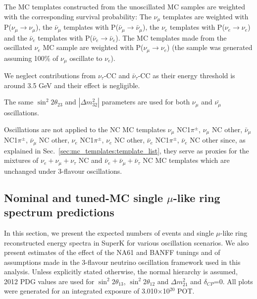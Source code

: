 The MC templates constructed from the unoscillated MC samples are weighted 
with the corresponding survival probability:
The $\nu_{\mu}$ templates are weighted with P($\nu_{\mu}\rightarrow\nu_{\mu}$),
the $\bar{\nu}_{\mu}$ templates with P($\bar{\nu}_{\mu}\rightarrow\bar{\nu}_{\mu}$),
the $\nu_{e}$ templates with P($\nu_{e}\rightarrow\nu_{e}$) and
the $\bar{\nu}_{e}$ templates with P($\bar{\nu}_{e}\rightarrow\bar{\nu}_{e}$).
The MC templates made from the oscillated $\nu_{e}$ MC sample are weighted with 
P($\nu_{\mu}\rightarrow\nu_{e}$) (the sample was generated assuming 100\% of 
$\nu_{\mu}$ oscillate to $\nu_{e}$).

We neglect contributions from $\nu_{\tau}$-CC and $\bar{\nu}_{\tau}$-CC as their
energy threshold is around 3.5 GeV and their effect is negligible.

The same $\sin^{2}{2\theta_{23}}$ and $|\Delta m^{2}_{32}|$ parameters 
are used for both $\nu_{\mu}$ and $\bar{\nu_{\mu}}$ oscillations.

Oscillations are not applied to the NC MC templates
  $\nu_{\mu}$ NC1$\pi^{\pm}$, 
  $\nu_{\mu}$ NC other, 
  $\bar{\nu}_{\mu}$ NC1$\pi^{\pm}$, 
  $\bar{\nu}_{\mu}$ NC other, 
  $\nu_{e}$ NC1$\pi^{\pm}$,
  $\nu_{e}$ NC other,
  $\bar{\nu}_{e}$ NC1$\pi^{\pm}$,
  $\bar{\nu}_{e}$ NC other
since, as explained in Sec.\ \ref{sec:mc_templates:template_list}, they serve as proxies for the mixtures of 
$\nu_{e}+\nu_{\mu}+\nu_{\tau}$ NC and 
$\bar{\nu}_{e}+\bar{\nu}_{\mu}+\bar{\nu}_{\tau}$ NC MC templates
which are unchanged under 3-flavour oscillations.



\subsection {Nominal and tuned-MC single $\mu$-like ring spectrum predictions}
\label{sec:nominal_and_tuned_predictions}

In this section, we present the expected numbers of events and single $\mu$-like ring 
reconstructed energy spectra in SuperK for various oscillation scenarios.
We also present estimates of the effect of the NA61 and BANFF tunings and of assumptions made in the 3-flavour 
neutrino oscillation framework used in this analysis.
Unless explicitly stated otherwise, the normal hierarchy is assumed, 2012 PDG values
are used for $\sin^{2}2\theta_{13}$, $\sin^{2}2\theta_{12}$ and $\Delta m^{2}_{21}$ 
and $\delta_{CP}$=0.
All plots were generated for an integrated exposure of 3.010$\times$10$^{20}$ POT.

